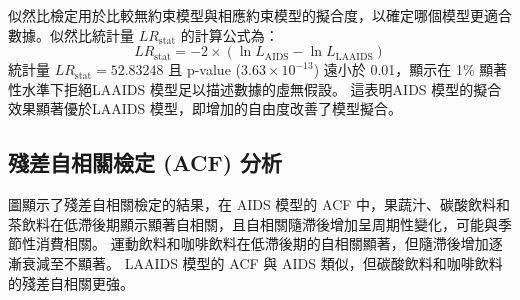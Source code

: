 
似然比檢定用於比較無約束模型與相應約束模型的擬合度，以確定哪個模型更適合數據。似然比統計量 \( LR_{\text{stat}} \) 的計算公式為：
\[
LR_{\text{stat}} = -2 \times (\ln L_{\text{AIDS}} - \ln L_{\text{LAAIDS}})
\]
統計量 \( LR_{\text{stat}} = 52.83248 \) 且 p-value (\( 3.63 \times 10^{-13} \)) 遠小於 0.01，顯示在 1\% 顯著性水準下拒絕LAAIDS 模型足以描述數據的虛無假設。
這表明AIDS 模型的擬合效果顯著優於LAAIDS 模型，即增加的自由度改善了模型擬合。




\subsection{殘差自相關檢定 (ACF) 分析}

圖\label{ACF}顯示了殘差自相關檢定的結果，在 AIDS 模型的 ACF 中，果蔬汁、碳酸飲料和茶飲料在低滯後期顯示顯著自相關，且自相關隨滯後增加呈周期性變化，可能與季節性消費相關。
運動飲料和咖啡飲料在低滯後期的自相關顯著，但隨滯後增加逐漸衰減至不顯著。
LAAIDS 模型的 ACF 與 AIDS 類似，但碳酸飲料和咖啡飲料的殘差自相關更強。
